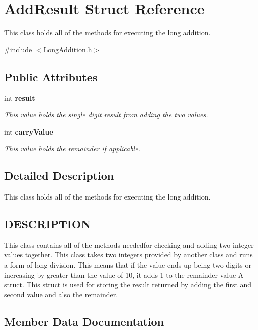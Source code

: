 \section{Add\+Result Struct Reference}
\label{struct_add_result}


This class holds all of the methods for executing the long addition.  




{\ttfamily \#include $<$Long\+Addition.\+h$>$}

\subsection*{Public Attributes}
\begin{DoxyCompactItemize}
\item 
int \textbf{ result}
\begin{DoxyCompactList}\small\item\em This value holds the single digit result from adding the two values. \end{DoxyCompactList}\item 
int \textbf{ carry\+Value}
\begin{DoxyCompactList}\small\item\em This value holds the remainder if applicable. \end{DoxyCompactList}\end{DoxyCompactItemize}


\subsection{Detailed Description}
This class holds all of the methods for executing the long addition. 

\subsection{D\+E\+S\+C\+R\+I\+P\+T\+I\+ON}\label{namespacestd_DESCRIPTION}
This class contains all of the methods neededfor checking and adding two integer values together. This class takes two integers provided by another class and runs a form of long division. This means that if the value ends up being two digits or increasing by greater than the value of 10, it adds 1 to the remainder value A struct. This struct is used for storing the result returned by adding the first and second value and also the remainder. 

\subsection{Member Data Documentation}
\mbox{\label{struct_add_result_a06d99d9daaebd0528d158e86441fd189}} 
